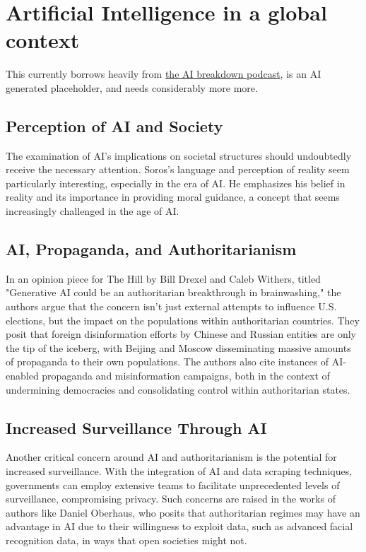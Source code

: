 \section{Artificial Intelligence in a global context}

This currently borrows heavily from \href{https://www.youtube.com/watch?v=5clOHBo8HP8}{the AI breakdown podcast}, is an AI generated placeholder, and needs considerably more more.

\subsection{Perception of AI and Society}
The examination of AI's implications on societal structures should undoubtedly receive the necessary attention. Soros's language and perception of reality seem particularly interesting, especially in the era of AI. He emphasizes his belief in reality and its importance in providing moral guidance, a concept that seems increasingly challenged in the age of AI.

\subsection{AI, Propaganda, and Authoritarianism}
In an opinion piece for The Hill by Bill Drexel and Caleb Withers, titled "Generative AI could be an authoritarian breakthrough in brainwashing," the authors argue that the concern isn't just external attempts to influence U.S. elections, but the impact on the populations within authoritarian countries. They posit that foreign disinformation efforts by Chinese and Russian entities are only the tip of the iceberg, with Beijing and Moscow disseminating massive amounts of propaganda to their own populations. The authors also cite instances of AI-enabled propaganda and misinformation campaigns, both in the context of undermining democracies and consolidating control within authoritarian states.

\subsection{Increased Surveillance Through AI}
Another critical concern around AI and authoritarianism is the potential for increased surveillance. With the integration of AI and data scraping techniques, governments can employ extensive teams to facilitate unprecedented levels of surveillance, compromising privacy. Such concerns are raised in the works of authors like Daniel Oberhaus, who posits that authoritarian regimes may have an advantage in AI due to their willingness to exploit data, such as advanced facial recognition data, in ways that open societies might not.

